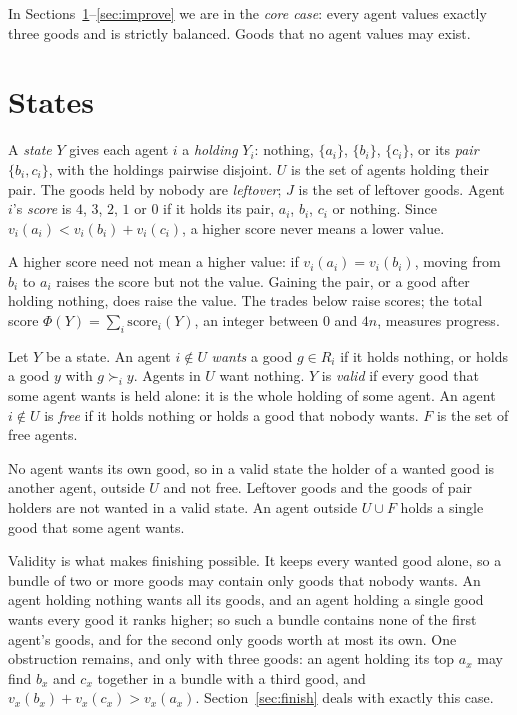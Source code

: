 \documentclass[runningheads,11pt]{llncs}
\begin{document}
\noindent In Sections~\ref{sec:states}--\ref{sec:improve} we are in the \emph{core case}: every agent values exactly three goods and is strictly balanced. Goods that no agent values may exist.

\section{States}\label{sec:states}

\begin{definition}\label{def:state}
A \emph{state} $Y$ gives each agent $i$ a \emph{holding} $Y_i$: nothing, $\{a_i\}$, $\{b_i\}$, $\{c_i\}$, or its \emph{pair} $\{b_i,c_i\}$, with the holdings pairwise disjoint. $U$ is the set of agents holding their pair. The goods held by nobody are \emph{leftover}; $J$ is the set of leftover goods. Agent $i$'s \emph{score} is $4$, $3$, $2$, $1$ or $0$ if it holds its pair, $a_i$, $b_i$, $c_i$ or nothing. Since $v_i(a_i)<v_i(b_i)+v_i(c_i)$, a higher score never means a lower value.
\end{definition}

\noindent A higher score need not mean a higher value: if $v_i(a_i)=v_i(b_i)$, moving from $b_i$ to $a_i$ raises the score but not the value. Gaining the pair, or a good after holding nothing, does raise the value. The trades below raise scores; the total score $\Phi(Y)=\sum_i\mathrm{score}_i(Y)$, an integer between $0$ and $4n$, measures progress.

\begin{definition}\label{def:valid}
Let $Y$ be a state. An agent $i\notin U$ \emph{wants} a good $g\in R_i$ if it holds nothing, or holds a good $y$ with $g\succ_i y$. Agents in $U$ want nothing. $Y$ is \emph{valid} if every good that some agent wants is held alone: it is the whole holding of some agent. An agent $i\notin U$ is \emph{free} if it holds nothing or holds a good that nobody wants. $F$ is the set of free agents.
\end{definition}

\noindent No agent wants its own good, so in a valid state the holder of a wanted good is another agent, outside $U$ and not free. Leftover goods and the goods of pair holders are not wanted in a valid state. An agent outside $U\cup F$ holds a single good that some agent wants.

Validity is what makes finishing possible. It keeps every wanted good alone, so a bundle of two or more goods may contain only goods that nobody wants. An agent holding nothing wants all its goods, and an agent holding a single good wants every good it ranks higher; so such a bundle contains none of the first agent's goods, and for the second only goods worth at most its own. One obstruction remains, and only with three goods: an agent holding its top $a_x$ may find $b_x$ and $c_x$ together in a bundle with a third good, and $v_x(b_x)+v_x(c_x)>v_x(a_x)$. Section~\ref{sec:finish} deals with exactly this case.
\end{document}
